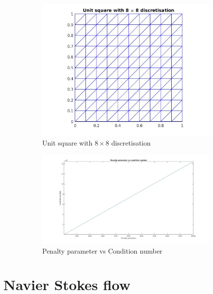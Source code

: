 \documentclass[a4paper]{book}
\begin{document}
\begin{figure}
\begin{subfigure}{\textwidth}	
  \includegraphics[width=\linewidth]{grid_penalty_parameter.jpg}
  \caption{Unit square with $8 \times 8$ discretisation}
  \label{grid_penalty_para}
\end{subfigure}
\begin{subfigure}{\textwidth}	
	\includegraphics[width=\linewidth]{penalty_condition_number.jpg}
	\caption{Penalty parameter vs Condition number}
	\label{penalty_condition_number}
\end{subfigure}
\caption{\label{effect_penalty_parameter}}
\end{figure}

\newpage

\section{Navier Stokes flow}\label{N-S-ch5}
\end{document}

